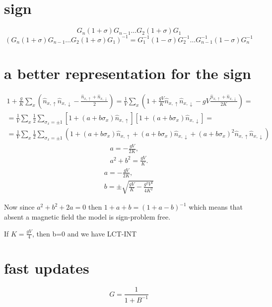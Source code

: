 \documentclass[onecolumn,english,prl,showpacs]{revtex4}
\newcommand{\Up}{{\uparrow}}
\newcommand{\Dn}{{\downarrow}}
\begin{document}
\section{sign}
\begin{equation}
 G_n(1+\sigma)G_{n-1}\ldots G_{2}(1+\sigma)G_1
\end{equation}
\begin{equation}
 (G_n(1+\sigma)G_{n-1}\ldots G_{2}(1+\sigma)G_1)^{-1} = G_1^{-1}(1-\sigma)G_{2}^{-1}\ldots G_{n-1}^{-1}(1-\sigma)G_n^{-1}
\end{equation}

\section{a better representation for the sign}

\begin{multline}
 1+\frac{g}{K} \sum_x (\hat{n}_{x, \Up} \hat{n}_{x,\Dn}-\frac{\hat{n}_{x, \Up}+\hat{n}_{x,\Dn}}{2}) = \frac{1}{V}\sum_x \left(1+\frac{gV}{K}\hat{n}_{x, \Up} \hat{n}_{x,\Dn}-gV\frac{\hat{n}_{x, \Up}+\hat{n}_{x,\Dn}}{2K}\right)=\\=
 \frac{1}{V}\sum_x \frac12 \sum_{\sigma_x=\pm1} \left[1+(a+b\sigma_x)\hat{n}_{x, \Up}\right]\left[1+(a+b\sigma_x) \hat{n}_{x,\Dn}\right]=\\=
 \frac{1}{V}\sum_x \frac12 \sum_{\sigma_x=\pm1} \left(1+(a+b\sigma_x)\hat{n}_{x, \Up}+(a+b\sigma_x) \hat{n}_{x,\Dn} + (a+b\sigma_x)^2\hat{n}_{x, \Up} \hat{n}_{x,\Dn} \right)
\end{multline}
\begin{eqnarray}
 a = -\frac{gV}{2K},\\
 a^2+b^2 = \frac{gV}{K}.
\end{eqnarray}
\begin{eqnarray}
 a = -\frac{gV}{2K},\\
 b = \pm\sqrt{\frac{gV}{K}-\frac{g^2V^2}{4K^2}}
\end{eqnarray}

Now since $a^2+b^2+2a=0$ then $1+a+b = (1+a-b)^{-1}$ which means that absent a magnetic field the model is sign-problem free.

If $K=\frac{gV}{4}$, then b=0 and we have LCT-INT

\section{fast updates}

\begin{equation}
 G = \frac{1}{1+B^{-1}}
\end{equation}
\end{document}
